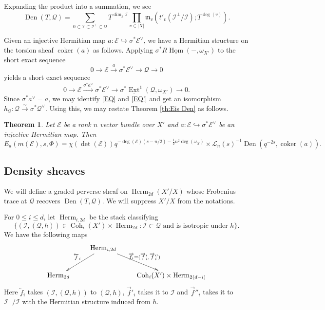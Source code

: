 \documentclass[reqno]{amsart}
\numberwithin{equation}{section}
\newcommand{\sL}{\ensuremath{\mathscr{L}}\xspace}
\newcommand{\ul}[1]{\underline{#1}}
\newcommand{\co}{\colon}
\newcommand{\inj}{\hookrightarrow}
\DeclareMathOperator{\coker}{coker}
\DeclareMathOperator{\Hom}{Hom}
\DeclareMathOperator{\Ext}{Ext}
\DeclareMathOperator{\Herm}{Herm}
\DeclareMathOperator{\Coh}{Coh}
\DeclareMathOperator{\Den}{Den}
\newcommand{\isom}{\stackrel{\sim}{\to}}
\newcommand\xr{\xrightarrow}
\newcommand{\oll}[1]{\overleftarrow{#1}}
\newcommand{\orr}[1]{\overrightarrow{#1}}
\newcommand{\s}{\sigma}
\newcommand\cE{\mathcal{E}}
\newcommand\cI{\mathcal{I}}
\newcommand\cQ{\mathcal{Q}}
\newcommand\fm{\mathfrak{m}}
\newtheorem{thm}{Theorem}[section]
\theoremstyle{remark}
\numberwithin{equation}{section}
\begin{document}
Expanding the product into a summation, we see
\begin{equation}\label{Den sum}
\Den(T, \cQ)=\sum_{0 \subset \cI \subset \cI^{\bot} \subset \cQ} T^{\dim_{k}\cI}\prod_{v\in |X|}\fm_{v}(t'_v(\cI^{\bot}/\cI);T^{\deg(v)}).
\end{equation}

Given an injective Hermitian map $a \co \cE \inj \s^* \cE^\vee$, we have a Hermitian structure on the torsion sheaf $\coker(a)$ as follows. Applying $\s^{*}R\ul{\Hom}(-,\omega_{X'})$ to the short exact sequence
\begin{equation}\label{EQ}
0\to \cE\xr{a} \s^{*}\cE^{\vee}\to \cQ\to 0
\end{equation}
yields a short exact sequence
\begin{equation}\label{EQ'}
0\to \cE\xr{\s^{*}a^{\vee}} \s^{*}\cE^{\vee}\to \s^{*}\ul{\Ext}^{1}(\cQ,\omega_{X'})\to 0.
\end{equation}
Since $\s^*a^{\vee}=a$, we may identify \eqref{EQ} and \eqref{EQ'} and get an isomorphism $h_{\cQ}: \cQ\isom \s^{*}\cQ^{\vee}$. Using this, we may restate Theorem \ref{th:Eis Den} as follows.
\begin{thm}\label{th:Eis Den torsion} Let $\cE$ be a rank $n$ vector bundle over $X'$ and $a:\cE\inj\s^{*}\cE^{\vee}$ be an injective Hermitian map. Then
\[
E_{a}(m(\cE),s,\Phi)=\chi(\det(\cE))q^{-\deg(\cE)( s-n/2)-\frac{1}{2}n^2\deg(\omega_X) }
\times \sL_n(s) ^{-1} \Den(q^{-2s}, \coker(a)).
\]
\end{thm}




\subsection{Density sheaves}
We will define a graded perverse sheaf on $\Herm_{2d}(X'/X)$ whose Frobenius trace at $\cQ$ recovers $\Den(T,\cQ)$.  We will suppress $X'/X$ from the notations.


For $0 \leq i \leq d$, let $\Herm_{i,2d}$ be the stack classifying 
\[
\{ (\cI, (\cQ,h)) \in \Coh_i(X') \times \Herm_{2d} \co \text{$\cI\subset \cQ$ and is  isotropic under $h$}\}.
\]
We have the following maps
\begin{equation*}
\xymatrix{& \Herm_{i,2d}\ar[dl]_{\oll{f}_{i}}\ar[dr]^{\orr{f_{i}}=(\orr{f}'_{i},\orr{f}''_{i})} \\
\Herm_{2d}& & \Coh_i(X') \times  \Herm_{2(d-i)}
}
\end{equation*}
Here $\oll{f}_{i}$ takes $(\cI,(\cQ,h))$ to $(\cQ,h)$, $\orr{f}'_{i}$ takes it to $\cI$ and $\orr{f}''_{i}$ takes it to $\cI^{\bot}/\cI$ with the Hermitian structure induced from $h$.
\end{document}

